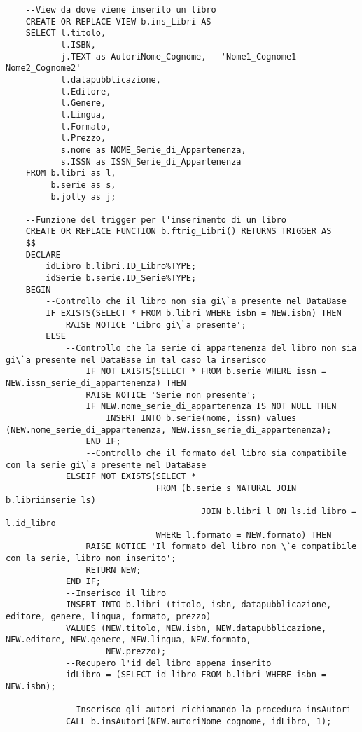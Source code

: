 \begin{lstlisting}
    --View da dove viene inserito un libro
    CREATE OR REPLACE VIEW b.ins_Libri AS
    SELECT l.titolo,
           l.ISBN,
           j.TEXT as AutoriNome_Cognome, --'Nome1_Cognome1 Nome2_Cognome2'
           l.datapubblicazione,
           l.Editore,
           l.Genere,
           l.Lingua,
           l.Formato,
           l.Prezzo,
           s.nome as NOME_Serie_di_Appartenenza,
           s.ISSN as ISSN_Serie_di_Appartenenza
    FROM b.libri as l,
         b.serie as s,
         b.jolly as j;
    
    --Funzione del trigger per l'inserimento di un libro
    CREATE OR REPLACE FUNCTION b.ftrig_Libri() RETURNS TRIGGER AS
    $$
    DECLARE
        idLibro b.libri.ID_Libro%TYPE;
        idSerie b.serie.ID_Serie%TYPE;
    BEGIN
        --Controllo che il libro non sia gi\`a presente nel DataBase
        IF EXISTS(SELECT * FROM b.libri WHERE isbn = NEW.isbn) THEN
            RAISE NOTICE 'Libro gi\`a presente';
        ELSE
            --Controllo che la serie di appartenenza del libro non sia gi\`a presente nel DataBase in tal caso la inserisco
                IF NOT EXISTS(SELECT * FROM b.serie WHERE issn = NEW.issn_serie_di_appartenenza) THEN
                RAISE NOTICE 'Serie non presente';
                IF NEW.nome_serie_di_appartenenza IS NOT NULL THEN
                    INSERT INTO b.serie(nome, issn) values (NEW.nome_serie_di_appartenenza, NEW.issn_serie_di_appartenenza);
                END IF;
                --Controllo che il formato del libro sia compatibile con la serie gi\`a presente nel DataBase
            ELSEIF NOT EXISTS(SELECT *
                              FROM (b.serie s NATURAL JOIN b.libriinserie ls)
                                       JOIN b.libri l ON ls.id_libro = l.id_libro
                              WHERE l.formato = NEW.formato) THEN
                RAISE NOTICE 'Il formato del libro non \`e compatibile con la serie, libro non inserito';
                RETURN NEW;
            END IF;
            --Inserisco il libro
            INSERT INTO b.libri (titolo, isbn, datapubblicazione, editore, genere, lingua, formato, prezzo)
            VALUES (NEW.titolo, NEW.isbn, NEW.datapubblicazione, NEW.editore, NEW.genere, NEW.lingua, NEW.formato,
                    NEW.prezzo);
            --Recupero l'id del libro appena inserito
            idLibro = (SELECT id_libro FROM b.libri WHERE isbn = NEW.isbn);
    
            --Inserisco gli autori richiamando la procedura insAutori
            CALL b.insAutori(NEW.autoriNome_cognome, idLibro, 1);
    

\end{lstlisting}
